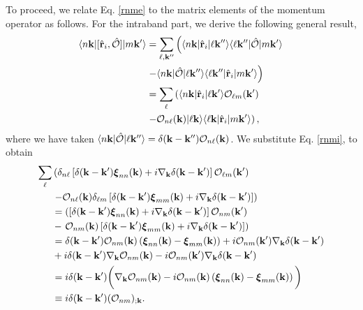 \documentclass[aps,letterpaper]{revtex4}
\begin{document}
To proceed, we relate Eq. \eqref{rnme} to the matrix elements of the momentum
operator as follows. For the intraband part, we derive the following general
result,
\begin{align}\label{conmri}
\langle n\mathbf{k} |[\hat{\mathbf{r}}_{i},\hat{{\cal O}}]| m\mathbf{k}' \rangle
&=
\sum_{\ell,\mathbf{k}''}
\left(
\langle n\mathbf{k} |
\hat{\mathbf{r}}_{i}
| \ell\mathbf{k}'' \rangle
\langle \ell\mathbf{k}'' |
\hat{{\cal O}}
| m\mathbf{k}' \rangle
\right.
\nonumber \\
&
\left.
-
\langle n\mathbf{k} |
\hat{{\cal O}}
| \ell\mathbf{k}'' \rangle
\langle \ell\mathbf{k}'' |
\hat{\mathbf{r}}_{i}
| m\mathbf{k}' \rangle
\right)
\nonumber \\
&=
\sum_{\ell}
\left(
\langle n\mathbf{k} |
\hat{\mathbf{r}}_{i}
| \ell\mathbf{k}' \rangle
{\cal O}_{\ell m}(\mathbf{k}')
\right.
\nonumber \\
&
\left.
-
{\cal O}_{n\ell}(\mathbf{k})
| \ell\mathbf{k} \rangle
\langle \ell\mathbf{k} |
\hat{\mathbf{r}}_{i}
| m\mathbf{k}' \rangle
\right)
,
\end{align}
where we have taken
$\langle n\mathbf{k} |\hat{{\cal O}}| \ell\mathbf{k}'' \rangle=\delta(\mathbf{k}-\mathbf{k}''){\cal O}_{n\ell}(\mathbf{k})$.
We substitute Eq. \eqref{rnmi}, to obtain
\begin{align}\label{conmri2}
\sum_{\ell}&
\left(
\delta_{n\ell}\left[\delta(\mathbf{k}-\mathbf{k}')\boldsymbol{\xi}_{nn}(\mathbf{k})
+i\nabla_{\mathbf{k}}\delta(\mathbf{k}-\mathbf{k}')\right]
{\cal O}_{\ell m}(\mathbf{k}')
\right.
\nonumber \\
&
\left.
-
{\cal O}_{n\ell}(\mathbf{k})
\delta_{\ell m}\left[\delta(\mathbf{k}-\mathbf{k}')\boldsymbol{\xi}_{mm}(\mathbf{k})
+i\nabla_{\mathbf{k}}\delta(\mathbf{k}-\mathbf{k}')\right]
\right)
\nonumber\\
&=
\left(
\left[\delta(\mathbf{k}-\mathbf{k}')\boldsymbol{\xi}_{nn}(\mathbf{k})
+i\nabla_{\mathbf{k}}\delta(\mathbf{k}-\mathbf{k}')\right]
{\cal O}_{n m}(\mathbf{k}')
\right.
\nonumber \\
&-
\left.
{\cal O}_{nm}(\mathbf{k})
\left[\delta(\mathbf{k}-\mathbf{k}')\boldsymbol{\xi}_{mm}(\mathbf{k})
+i\nabla_{\mathbf{k}}\delta(\mathbf{k}-\mathbf{k}')\right]
\right)
\nonumber\\
&=
\delta(\mathbf{k}-\mathbf{k}')
{\cal O}_{nm}(\mathbf{k})
\left(
\boldsymbol{\xi}_{nn}(\mathbf{k})
-
\boldsymbol{\xi}_{mm}(\mathbf{k})
\right)
+i{\cal O}_{n m}(\mathbf{k}')
\nabla_{\mathbf{k}}
\delta(\mathbf{k}-\mathbf{k}')
\nonumber \\
&+i
\delta(\mathbf{k}-\mathbf{k}')
\nabla_{\mathbf{k}}
{\cal O}_{n m}(\mathbf{k})
-
i{\cal O}_{n m}(\mathbf{k}')
\nabla_{\mathbf{k}}\delta(\mathbf{k}-\mathbf{k}')
\nonumber \\
&=
i\delta(\mathbf{k}-\mathbf{k}')
\bigg(
\nabla_{\mathbf{k}}
{\cal O}_{n m}(\mathbf{k})
-
i
{\cal O}_{nm}(\mathbf{k})
\left(
\boldsymbol{\xi}_{nn}(\mathbf{k})
-
\boldsymbol{\xi}_{mm}(\mathbf{k})
\right)
\bigg)
\nonumber \\
&\equiv
i\delta(\mathbf{k}-\mathbf{k}')({\cal O}_{nm})_{;\mathbf{k}}
.
\end{align}
\end{document}
